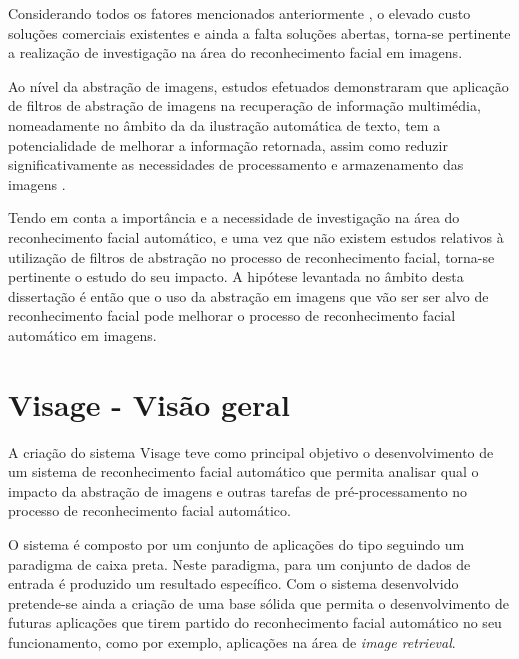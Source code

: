 Considerando todos os fatores mencionados anteriormente , o elevado custo soluções comerciais existentes e ainda a falta soluções abertas, torna-se pertinente a realização de investigação na área do reconhecimento facial em imagens. 

Ao nível da abstração de imagens, estudos efetuados demonstraram que aplicação de filtros de abstração de imagens na recuperação de informação multimédia, nomeadamente no âmbito da da ilustração automática de texto, tem a potencialidade de melhorar a informação retornada, assim como reduzir significativamente as necessidades de processamento e armazenamento das imagens \cite{Coelho:2012:IAC:2260641.2260676}. 

Tendo em conta a importância e a necessidade de investigação na área do reconhecimento facial automático, e uma vez que não existem estudos relativos à utilização de filtros de abstração no processo de reconhecimento facial, torna-se pertinente o estudo do seu impacto. A hipótese levantada no âmbito desta dissertação é então que o uso da abstração em imagens que vão ser ser alvo de reconhecimento facial pode melhorar o processo de reconhecimento facial automático em imagens.

\section{Visage - Visão geral} \label{sec:visage}
A criação do sistema Visage teve como principal objetivo o desenvolvimento de um sistema de reconhecimento facial automático que permita analisar qual o impacto da abstração de imagens e outras tarefas de pré-processamento no processo de reconhecimento facial automático. 

O sistema é composto por um conjunto de aplicações do tipo seguindo um paradigma de caixa preta. Neste paradigma, para um conjunto de dados de entrada é produzido um resultado específico. Com o sistema desenvolvido pretende-se ainda a criação de uma base sólida que permita o desenvolvimento de futuras aplicações que tirem partido do reconhecimento facial automático no seu funcionamento, como por exemplo, aplicações na área de \textit{image retrieval}.

